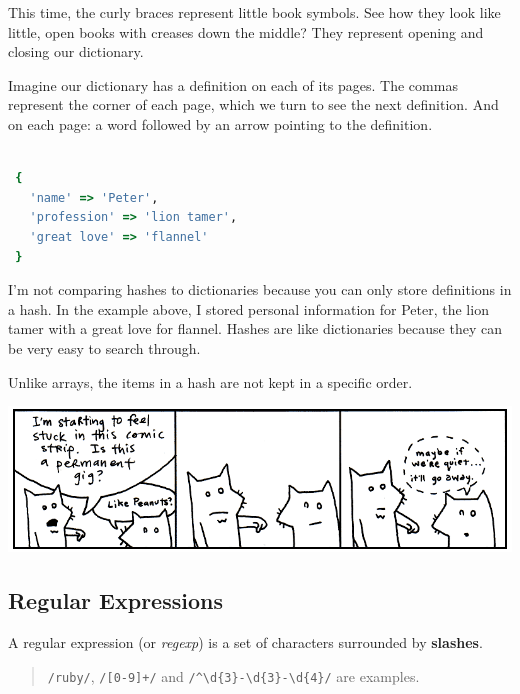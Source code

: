 \documentclass[10pt,twoside]{report}
\begin{document}
This time, the curly braces represent little book symbols.  See how
they look like little, open books with creases down the middle?  They
represent opening and closing our dictionary.

Imagine our dictionary has a definition on each of its pages.  The
commas represent the corner of each page, which we turn to see the
next definition.  And on each page: a word followed by an arrow
pointing to the definition.


\begin{lstlisting}[basicstyle=\ttfamily\color{basiccolor},
    commentstyle = \ttfamily\color{commentcolor},
    keywordstyle=\ttfamily\color{keywordscolor},
    stringstyle=\color{stringcolor},
    language=Ruby,
    basicstyle=\small\ttfamily,
    showstringspaces=false,
  ]

 {
   'name' => 'Peter',
   'profession' => 'lion tamer',
   'great love' => 'flannel'
 }

\end{lstlisting}


I'm not comparing hashes to dictionaries because you can only store
definitions in a hash.  In the example above, I stored personal
information for Peter, the lion tamer with a great love for flannel.
Hashes are like dictionaries because they can be very easy to search
through.

Unlike arrays, the items in a hash are not kept in a specific order.

	\includegraphics[width=1.0\textwidth]{cache/15.png}




\subsection{Regular Expressions}



A regular expression (or {\em regexp}) is a set of characters
surrounded by {\bf slashes}.

\begin{quote}
\lstinline[breaklines=true]|/ruby/|,
\lstinline[breaklines=true]|/[0-9]+/| and
\lstinline[breaklines=true]|/^\d{3}-\d{3}-\d{4}/| are
examples.\end{quote}
\end{document}
